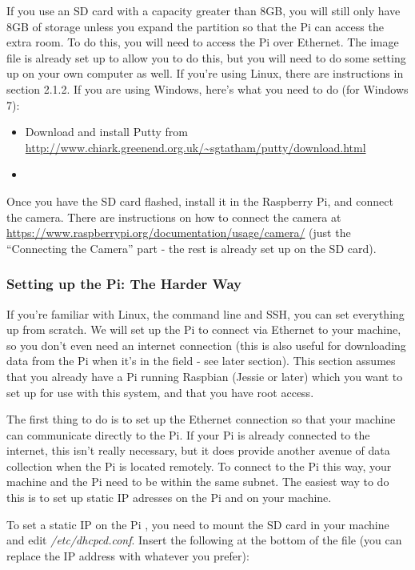 \documentclass[10pt]{article}
\begin{document}
If you use an SD card with a capacity greater than 8GB, you will still only have 8GB of storage unless you expand the partition so that the Pi can
access the extra room. To do this, you will need to access the Pi over Ethernet. The image file is already set up to allow you to do this, but you will need to
do some setting up on your own computer as well. If you're using Linux, there are instructions in section 2.1.2. If you are using Windows, here's what you need
to do (for Windows 7):

\begin{itemize}
 \item Download and install Putty from \url{http://www.chiark.greenend.org.uk/~sgtatham/putty/download.html}
 \item 
\end{itemize}


Once you have the SD card flashed, install it in the Raspberry Pi, and connect the camera. There are instructions on how to connect the camera at
\url{https://www.raspberrypi.org/documentation/usage/camera/} (just the ``Connecting the Camera'' part - the rest is already set up on the SD card).

\subsubsection{Setting up the Pi: The Harder Way}
If you're familiar with Linux, the command line and SSH, you can set everything up from scratch. We will set up the Pi to connect via Ethernet to your machine, so you don't
even need an internet connection (this is also useful for downloading data from the Pi when it's in the field - see later section). This section assumes that you already
have a Pi running Raspbian (Jessie or later) which you want to set up for use with this system, and that you have root access. 

The first thing to do is to set up the Ethernet connection so that your machine can communicate directly to the Pi. If your Pi is already connected to the internet, this
isn't really necessary, but it does provide another avenue of data collection when the Pi is located remotely. To connect to the Pi this way, your machine and the Pi 
need to be within the same subnet. The easiest way to do this is to set up static IP adresses on the Pi and on your machine.

To set a static IP on the Pi , you need to mount the SD card in your machine and edit \textit{/etc/dhcpcd.conf}. Insert the following at the bottom of the file (you can 
replace the IP address with whatever you prefer):
\end{document}
